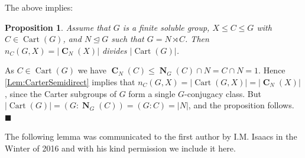 \documentclass[a4paper,12pt,reqno]{amsart}
\newtheorem{proposition}[theorem]{Proposition}
\numberwithin{equation}{section}
\DeclareMathOperator{\N}{\mathbf{N}}
\DeclareMathOperator{\cart}{Cart}
\DeclareMathOperator{\cent}{\mathbf{C}}
\newcommand{\card}[1]{\left\lvert{#1}\right\rvert}
\renewcommand{\leq}{\leqslant}
\newenvironment{proofof}{{\bf {Proof.} }}{\hfill $\blacksquare$ \\}
\begin{document}
The above implies:

\begin{proposition}\label{Prop:SemidirWithCart}
Assume that $G$ is a finite soluble group, $X \leq C \leq G$ with $C \in \cart(G)$, 
and $N \unlhd G$ such that $G = N \rtimes C$. 
Then $n_C(G, X) = \card{\cent_N(X)}$  divides $\card{\cart(G)}$.
\end{proposition}

\begin{proofof}
As $C \in \cart(G)$ we have $\cent_N(C) \leq \N_G(C) \cap N  = C \cap N = 1$. 
Hence \autoref{Lem:CarterSemidirect} implies that $n_C(G, X) =  \card{\cart(G, X)}  = \card{\cent_N(X)}$, 
since the Carter subgroups of $G$ form a single $G$-conjugacy class. 
But $\card{\cart(G)} = (G : \N_G(C)) = (G : C) = |N| $, 
and the proposition follows.
\end{proofof}



The following lemma was communicated to the first author by I.M. Isaacs in the Winter of 2016 and with his kind permission we include it here.
\end{document}
